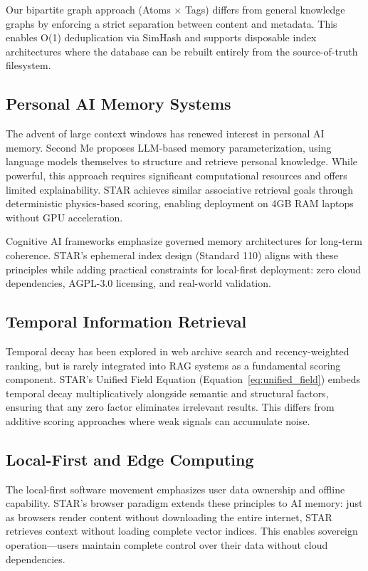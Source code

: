 \documentclass[11pt]{article}
\begin{document}
Our bipartite graph approach (Atoms $\times$ Tags) differs from general knowledge graphs by enforcing a strict separation between content and metadata. This enables O(1) deduplication via SimHash \cite{charikar2002similar} and supports disposable index architectures where the database can be rebuilt entirely from the source-of-truth filesystem.

\subsection{Personal AI Memory Systems}

The advent of large context windows has renewed interest in personal AI memory. Second Me \cite{wei2025second} proposes LLM-based memory parameterization, using language models themselves to structure and retrieve personal knowledge. While powerful, this approach requires significant computational resources and offers limited explainability. STAR achieves similar associative retrieval goals through deterministic physics-based scoring, enabling deployment on 4GB RAM laptops without GPU acceleration.

Cognitive AI frameworks \cite{salas2025cognitive} emphasize governed memory architectures for long-term coherence. STAR's ephemeral index design (Standard 110) aligns with these principles while adding practical constraints for local-first deployment: zero cloud dependencies, AGPL-3.0 licensing, and real-world validation.

\subsection{Temporal Information Retrieval}

Temporal decay has been explored in web archive search \cite{kanhabua2008surviving} and recency-weighted ranking, but is rarely integrated into RAG systems as a fundamental scoring component. STAR's Unified Field Equation (Equation~\ref{eq:unified_field}) embeds temporal decay multiplicatively alongside semantic and structural factors, ensuring that any zero factor eliminates irrelevant results. This differs from additive scoring approaches where weak signals can accumulate noise.

\subsection{Local-First and Edge Computing}

The local-first software movement \cite{haque2023local} emphasizes user data ownership and offline capability. STAR's browser paradigm extends these principles to AI memory: just as browsers render content without downloading the entire internet, STAR retrieves context without loading complete vector indices. This enables sovereign operation---users maintain complete control over their data without cloud dependencies.
\end{document}
